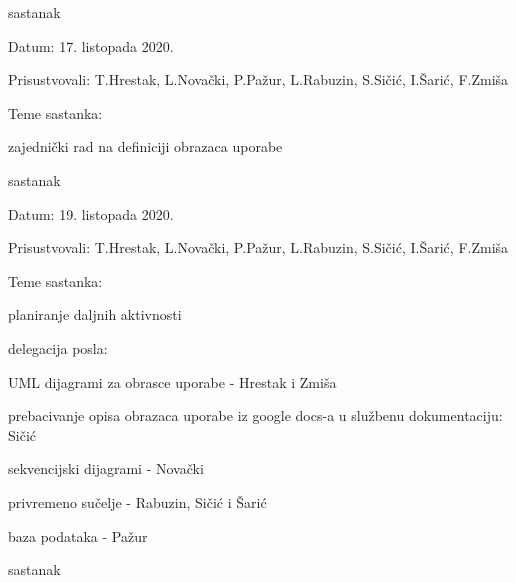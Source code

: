 \begin{packed_enum}
			\item  sastanak
			
			\item[] \begin{packed_item}
				\item Datum: 17. listopada 2020.
				\item Prisustvovali: T.Hrestak, L.Novački, P.Pažur, L.Rabuzin, S.Sičić, I.Šarić, F.Zmiša
				\item Teme sastanka:
				\begin{packed_item}
					\item  zajednički rad na definiciji obrazaca uporabe
				\end{packed_item}
			\end{packed_item}
		
			\item  sastanak
			
			\item[] \begin{packed_item}
				\item Datum: 19. listopada 2020.
				\item Prisustvovali: T.Hrestak, L.Novački, P.Pažur, L.Rabuzin, S.Sičić, I.Šarić, F.Zmiša
				\item Teme sastanka:
				\begin{packed_item}
					\item  planiranje daljnih aktivnosti
					\item  delegacija posla:
					\begin{packed_item}
						\item  UML dijagrami za obrasce uporabe - Hrestak i Zmiša
						\item  prebacivanje opisa obrazaca uporabe iz google docs-a u službenu dokumentaciju: Sičić
						\item  sekvencijski dijagrami - Novački
						\item  privremeno sučelje - Rabuzin, Sičić i Šarić
						\item  baza podataka - Pažur
					\end{packed_item}
				\end{packed_item}
			\end{packed_item}
		
				\item  sastanak
			

\end{packed_enum}
